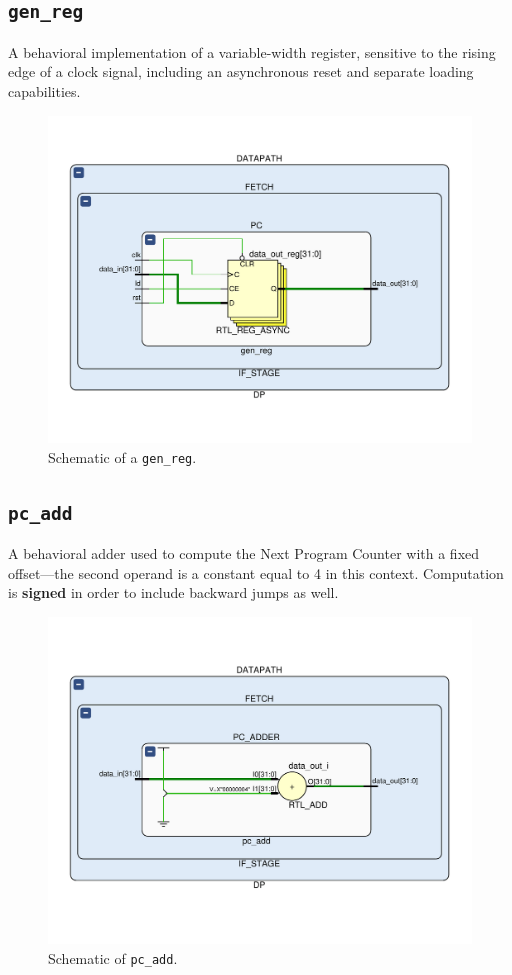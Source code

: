 \subsection{\texttt{gen\_reg}}
A behavioral implementation of a variable-width register, sensitive to the rising edge of a clock signal, including an asynchronous reset and separate loading capabilities.

\begin{figure}[!ht]
\centering
\includegraphics[width=\textwidth]{./chapters/figures/gen_reg.pdf} 
\caption{Schematic of a \texttt{gen\_reg}.}
\end{figure}

\subsection{\texttt{pc\_add}}
A behavioral adder used to compute the Next Program Counter with a fixed offset—the second operand is a constant equal to 4 in this context. Computation is \textbf{signed} in order to include backward jumps as well.

\begin{figure}[!ht]
\centering
\includegraphics[width=\textwidth]{./chapters/figures/pc_add.pdf} 
\caption{Schematic of \texttt{pc\_add}.}
\end{figure}

